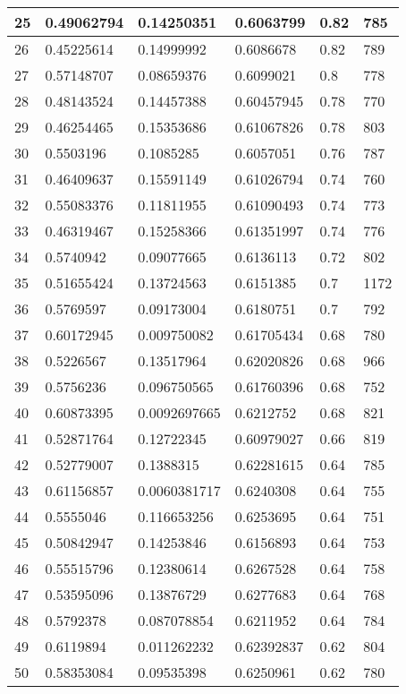 \begin{longtable}{|l|l|l|l|l|l|}
25 & 0.49062794 & 0.14250351 & 0.6063799 & 0.82 & 785 \\ \hline 
26 & 0.45225614 & 0.14999992 & 0.6086678 & 0.82 & 789 \\ \hline 
27 & 0.57148707 & 0.08659376 & 0.6099021 & 0.8 & 778 \\ \hline 
28 & 0.48143524 & 0.14457388 & 0.60457945 & 0.78 & 770 \\ \hline 
29 & 0.46254465 & 0.15353686 & 0.61067826 & 0.78 & 803 \\ \hline 
30 & 0.5503196 & 0.1085285 & 0.6057051 & 0.76 & 787 \\ \hline 
31 & 0.46409637 & 0.15591149 & 0.61026794 & 0.74 & 760 \\ \hline 
32 & 0.55083376 & 0.11811955 & 0.61090493 & 0.74 & 773 \\ \hline 
33 & 0.46319467 & 0.15258366 & 0.61351997 & 0.74 & 776 \\ \hline 
34 & 0.5740942 & 0.09077665 & 0.6136113 & 0.72 & 802 \\ \hline 
35 & 0.51655424 & 0.13724563 & 0.6151385 & 0.7 & 1172 \\ \hline 
36 & 0.5769597 & 0.09173004 & 0.6180751 & 0.7 & 792 \\ \hline 
37 & 0.60172945 & 0.009750082 & 0.61705434 & 0.68 & 780 \\ \hline 
38 & 0.5226567 & 0.13517964 & 0.62020826 & 0.68 & 966 \\ \hline 
39 & 0.5756236 & 0.096750565 & 0.61760396 & 0.68 & 752 \\ \hline 
40 & 0.60873395 & 0.0092697665 & 0.6212752 & 0.68 & 821 \\ \hline 
41 & 0.52871764 & 0.12722345 & 0.60979027 & 0.66 & 819 \\ \hline 
42 & 0.52779007 & 0.1388315 & 0.62281615 & 0.64 & 785 \\ \hline 
43 & 0.61156857 & 0.0060381717 & 0.6240308 & 0.64 & 755 \\ \hline 
44 & 0.5555046 & 0.116653256 & 0.6253695 & 0.64 & 751 \\ \hline 
45 & 0.50842947 & 0.14253846 & 0.6156893 & 0.64 & 753 \\ \hline 
46 & 0.55515796 & 0.12380614 & 0.6267528 & 0.64 & 758 \\ \hline 
47 & 0.53595096 & 0.13876729 & 0.6277683 & 0.64 & 768 \\ \hline 
48 & 0.5792378 & 0.087078854 & 0.6211952 & 0.64 & 784 \\ \hline 
49 & 0.6119894 & 0.011262232 & 0.62392837 & 0.62 & 804 \\ \hline 
50 & 0.58353084 & 0.09535398 & 0.6250961 & 0.62 & 780 \\ \hline 
\end{longtable}